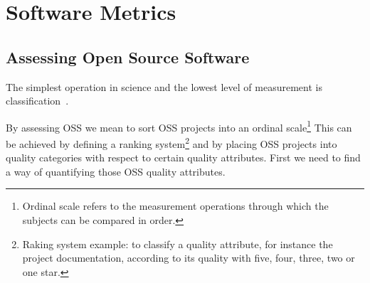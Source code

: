 \thispagestyle{empty}
\chapter{Software Metrics}\label{chap:software_metrics}


\section{Assessing Open Source Software} \label{sec:assessing}
The simplest operation in science and the lowest level of measurement is classification~\cite{kan2002metrics}.

By assessing OSS we mean to sort OSS projects into an
\textsf{ordinal scale}\footnote{Ordinal scale refers to the measurement operations through which the subjects can be compared in order.}
This can be achieved by defining a
\textsf{ranking system}\footnote{
  Raking system example: to classify a quality attribute, for instance the project documentation, according to its quality with
  five, four, three, two or one star.
} and by placing OSS projects into quality categories with respect to certain quality attributes.
First we need to find a way of quantifying those OSS quality attributes.

